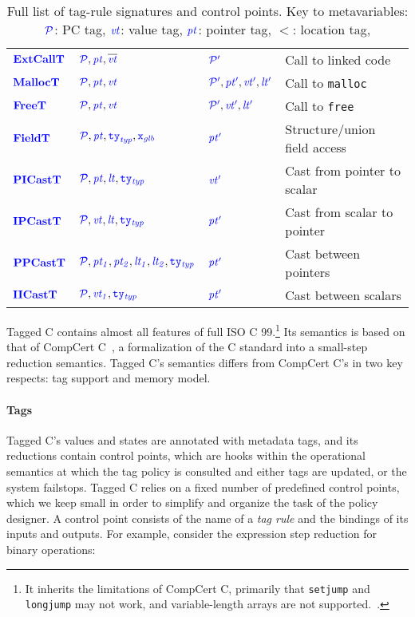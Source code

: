 \documentclass{llncs}
\begin{document}
\begin{table}[t]
\begin{tabular}{|l|l|l|l|}
    \(\extcalltname\)   & \(\extcalltargs\)      & \(\extcalltres\)   & Call to linked code \\
    \(\malloctname\)    & \(\malloctargs\)       & \(\malloctres\)    & Call to {\tt malloc} \\
    \(\freetname\)      & \(\freetargs\)         & \(\freetres\)      & Call to {\tt free} \\
    \(\fieldtname\)     & \(\fieldtargs\)        & \(\fieldtres\)     & Structure/union field access \\
    \(\picasttname\)    & \(\picasttargs\)       & \(\picasttres\)    & Cast from pointer to scalar \\
    \(\ipcasttname\)    & \(\ipcasttargs\)       & \(\ipcasttres\)    & Cast from scalar to pointer \\
    \(\ppcasttname\)    & \(\ppcasttargs\)       & \(\ppcasttres\)    & Cast between pointers \\
    \(\iicasttname\)    & \(\iicasttargs\)       & \(\iicasttres\)    & Cast between scalars \\
    \hline
  \end{tabular}

  \caption{Full list of tag-rule signatures and control points. Key to metavariables:
    \(\PCT\): PC tag, \(\vt\): value tag, \(\pt\): pointer tag, \(\lt\): location tag,
}
  \label{fig:controlpoints}
\end{table}

Tagged C contains almost all features of full ISO C 99.\footnote{
It inherits the limitations of CompCert C, primarily that {\tt setjump} and {\tt longjump}
may not work, and variable-length arrays are not supported.~\cite[Ch. 5]{Leroy23:CompCertManual}.}
Its semantics is based on that of CompCert C~\cite{Leroy09:CompCert},
a formalization of the C standard into a small-step reduction semantics.
Tagged C's semantics differs from CompCert C's in two key respects: tag support and memory model.

\paragraph{Tags}
Tagged C's values
and states are annotated with metadata tags, and its reductions contain
control points, which are hooks within the
operational semantics at which the tag policy is consulted and either tags are updated, or the system
failstops.
Tagged C relies on a fixed number of predefined control points, which we keep small
in order to simplify and organize the task of the policy designer.
A control point consists of the name of a {\em tag rule}
and the bindings of its inputs and outputs. For example, consider the expression step reduction
for binary operations:
\end{document}
